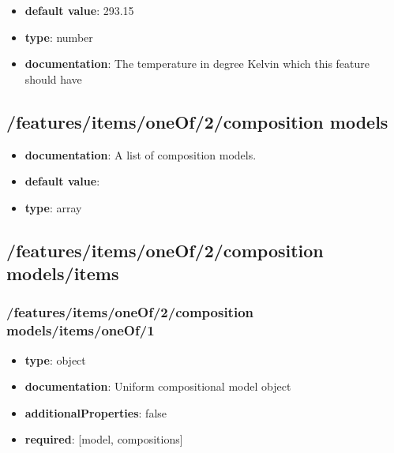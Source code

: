\begin{itemize}\item {\bf default value}: 293.15
\item {\bf type}: number
\item {\bf documentation}: The temperature in degree Kelvin which this feature should have
\end{itemize}\subsection{/features/items/oneOf/2/composition models}
\begin{itemize}\item {\bf documentation}: A list of composition models.
\item {\bf default value}: 
\item {\bf type}: array
\end{itemize}\subsection{/features/items/oneOf/2/composition models/items}

\subsubsection{/features/items/oneOf/2/composition models/items/oneOf/1}
\begin{itemize}\item {\bf type}: object
\item {\bf documentation}: Uniform compositional model object
\item {\bf additionalProperties}: false
\item {\bf required}: [model, compositions]\end{itemize}
